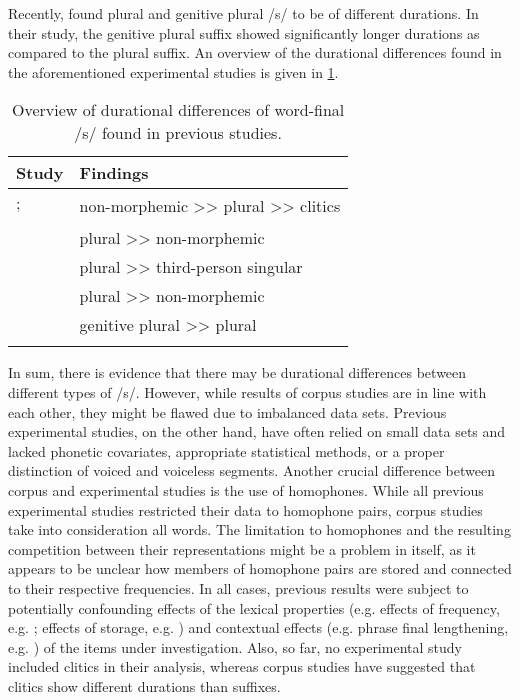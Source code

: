 Recently, \citet{Plag2020} found plural and genitive plural /s/ to be of different durations. In their study, the genitive plural suffix showed significantly longer durations as compared to the plural suffix. An overview of the durational differences found in the aforementioned experimental studies is given in \ref{tab:2.1}.

\begin{table}\fontsize{10}{11}
\caption{Overview of durational differences of word-final /s/ found in previous studies.}
\label{tab:2.1}
\begin{tabular}{ll}
\lsptoprule
Study                                & Findings                                         \\
\midrule
\cite{Zimmermann2016, Plag2017}; & \multirow{2}{*}{non-morphemic >>
plural >> clitics}  \\
\cite{Tomaschek2019}               &                                                  \\
\cite{Walsh1983}                  & plural >> non-morphemic                            \\
\cite{Hsieh1999}                   & plural >> third-person singular                    \\
\cite{Seyfarth2017}                & plural >> non-morphemic                            \\
\cite{Plag2020}                    & genitive plural >> plural                 \\
\lspbottomrule
\end{tabular}
\end{table}

In sum, there is evidence that there may be durational differences between different types of /s/. However, while results of corpus studies are in line with each other, they might be flawed due to imbalanced data sets. Previous experimental studies, on the other hand, have often relied on small data sets and lacked phonetic covariates, appropriate statistical methods, or a proper distinction of voiced and voiceless segments. Another crucial difference between corpus and experimental studies is the use of homophones. While all previous experimental studies restricted their data to homophone pairs, corpus studies take into consideration all words. The limitation to homophones and the resulting competition between their representations might be a problem in itself, as it appears to be unclear how members of homophone pairs are stored and connected to their respective frequencies. In all cases, previous results were subject to potentially confounding effects of the lexical properties (e.g. effects of frequency, e.g. \cite{Gahl2008,Lohmann2018}; effects of storage, e.g. \cite{Caselli2016}) and contextual effects (e.g. phrase final lengthening, e.g. \cite{Klatt1976,Wightman1992}) of the items under investigation. Also, so far, no experimental study included clitics in their analysis, whereas corpus studies have suggested that clitics show different durations than suffixes.


